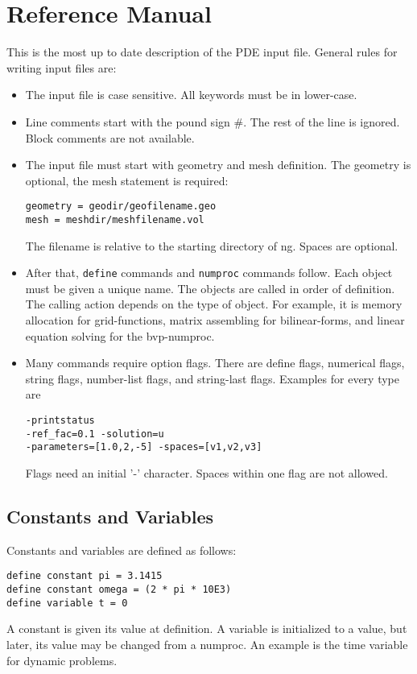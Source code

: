 \documentclass[12pt]{book}
\begin{document}
\chapter{Reference Manual}

This is the most up to date description of the PDE input file. 
General rules for writing input files are:
\begin{itemize}
\item
The input file is case sensitive. All keywords must be in lower-case.
\item
Line comments start with the pound sign \#. The rest of the line is ignored.
Block comments are not available.
\item
The input file must start with geometry and mesh definition. The geometry is optional,
the mesh statement is required:
\begin{verbatim}
geometry = geodir/geofilename.geo
mesh = meshdir/meshfilename.vol
\end{verbatim}
The filename is relative to the starting directory of ng. Spaces are optional.
\item
After that, {\tt define} commands and {\tt numproc} commands
follow. Each object must be given a unique name.  The objects are
called in order of definition. The calling action depends on the type
of object. For example, it is memory allocation for grid-functions,
matrix assembling for bilinear-forms, and linear equation solving for
the bvp-numproc.
\item
Many commands require option flags. There are define flags, numerical flags, 
string flags, number-list flags, and string-last flags. Examples for every type are
\begin{verbatim}
-printstatus 
-ref_fac=0.1 -solution=u 
-parameters=[1.0,2,-5] -spaces=[v1,v2,v3]
\end{verbatim}
Flags need an initial '-' character. Spaces within one flag are not allowed.
\end{itemize}

\section{Constants and Variables}
\label{sec_constants}
Constants and variables are defined as follows:
\begin{verbatim}
define constant pi = 3.1415
define constant omega = (2 * pi * 10E3)
define variable t = 0
\end{verbatim}
A constant is given its value at definition. A variable is
initialized to a value, but later, its value may be changed
from a numproc. An example is the time variable for dynamic problems.
\end{document}
